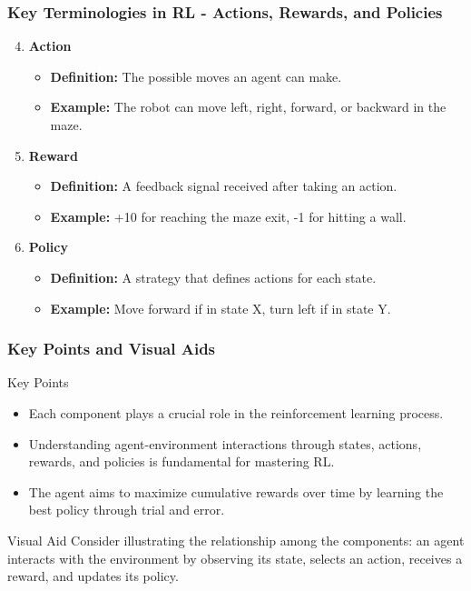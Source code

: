 \documentclass{beamer}
\begin{document}
\begin{frame}[fragile]
    \frametitle{Key Terminologies in RL - Actions, Rewards, and Policies}
    \begin{enumerate}
        \setcounter{enumi}{3}
        \item \textbf{Action}  
            \begin{itemize}
                \item \textbf{Definition:} The possible moves an agent can make.
                \item \textbf{Example:} The robot can move left, right, forward, or backward in the maze.
            \end{itemize}

        \item \textbf{Reward}  
            \begin{itemize}
                \item \textbf{Definition:} A feedback signal received after taking an action.
                \item \textbf{Example:} +10 for reaching the maze exit, -1 for hitting a wall.
            \end{itemize}

        \item \textbf{Policy}  
            \begin{itemize}
                \item \textbf{Definition:} A strategy that defines actions for each state.
                \item \textbf{Example:} Move forward if in state X, turn left if in state Y.
            \end{itemize}
    \end{enumerate}
\end{frame}

\begin{frame}[fragile]
    \frametitle{Key Points and Visual Aids}
    \begin{block}{Key Points}
        \begin{itemize}
            \item Each component plays a crucial role in the reinforcement learning process.
            \item Understanding agent-environment interactions through states, actions, rewards, and policies is fundamental for mastering RL.
            \item The agent aims to maximize cumulative rewards over time by learning the best policy through trial and error.
        \end{itemize}
    \end{block}
    
    \begin{block}{Visual Aid}
        Consider illustrating the relationship among the components: 
        an agent interacts with the environment by observing its state, selects an action, receives a reward, and updates its policy.
    \end{block}
\end{frame}
\end{document}
